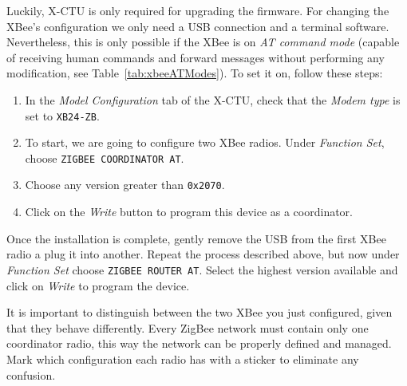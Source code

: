Luckily, X-CTU is only required for upgrading the firmware. For changing the XBee's configuration we only need a USB connection and a terminal software. Nevertheless, this is only possible if the XBee is on \emph{AT command mode} (capable of receiving human commands and forward messages without performing any modification, see Table~\ref{tab:xbeeATModes}). To set it on, follow these steps:

\begin{enumerate}
	\item In the \emph{Model Configuration} tab of the X-CTU, check that the \emph{Modem type} is set to \texttt{XB24-ZB}.
	\item To start, we are going to configure two XBee radios. Under \emph{Function Set}, choose \texttt{ZIGBEE COORDINATOR AT}.
	\item Choose any version greater than \texttt{0x2070}.
	\item Click on the \emph{Write} button to program this device as a coordinator.
\end{enumerate}

Once the installation is complete, gently remove the USB from the first XBee radio a plug it into another. Repeat the process described above, but now under \emph{Function Set} choose \texttt{ZIGBEE ROUTER AT}. Select the highest version available and click on \emph{Write} to program the device.

It is important to distinguish between the two XBee you just configured, given that they behave differently. Every ZigBee network must contain only one coordinator radio, this way the network can be properly defined and managed. Mark which configuration each radio has with a sticker to eliminate any confusion.

\begin{table}[htbp]
	\centering
	\caption{XBee AT modes}
	\label{tab:xbeeATModes}
\end{table}

